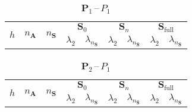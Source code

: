 \documentclass[12pt]{article}
\newcommand{\vect}[1]{\boldsymbol{\mathbf{#1}}}
\begin{document}
\begin{table}[h!]
	\centering
	\caption{$\vect P_1$\,--\,$P_1$} 
	\label{tab:p1p1}
	\begin{tabular}[1.5]{|c|c|c|c|c|c|c|c|c|}
		\hline
		\multirow{2}{*}{$h$} & \multirow{2}{*}{$n_{\vect A}$} & \multirow{2}{*}{$n_{\vect S}$} & \multicolumn{2}{c|}{$\vect S_0$} & \multicolumn{2}{c|}{$\vect S_n$} & \multicolumn{2}{c|}{$\vect S_{\text{full}}$} \\ 
		\cline{4-9}
		& & & $\lambda_2$ & $\lambda_{n_{\vect S}}$ & $\lambda_2$ & $\lambda_{n_{\vect S}}$ & $\lambda_2$ & $\lambda_{n_{\vect S}}$ \\ 
		\hline
		
	\end{tabular}
\end{table}

\begin{table}[h!]
	\centering
	\caption{$\vect P_2$\,--\,$P_1$} 
	\label{tab:p2p1}
	\begin{tabular}[1.5]{|c|c|c|c|c|c|c|c|c|}
		\hline
		\multirow{2}{*}{$h$} & \multirow{2}{*}{$n_{\vect A}$} & \multirow{2}{*}{$n_{\vect S}$} & \multicolumn{2}{c|}{$\vect S_0$} & \multicolumn{2}{c|}{$\vect S_n$} & \multicolumn{2}{c|}{$\vect S_{\text{full}}$} \\ 
		\cline{4-9}
		& & & $\lambda_2$ & $\lambda_{n_{\vect S}}$ & $\lambda_2$ & $\lambda_{n_{\vect S}}$ & $\lambda_2$ & $\lambda_{n_{\vect S}}$ \\ 
		\hline
		
	\end{tabular}
\end{table}
\end{document}
